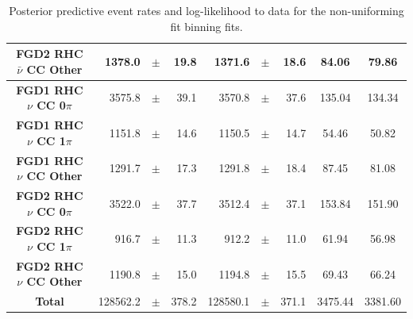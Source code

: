 \begin{center}
\begin{table}
\begin{adjustbox}{max width=1.1\textwidth,center}
\begin{tabular}{S||
                r
                p{0.26cm}
                r
                |r
                p{0.26cm}
                r
                |c
                |c}
\textbf{FGD2 RHC $\bar{\nu}$ CC Other} & 1378.0 & $\pm$ & 19.8 & 1371.6 & $\pm$ & 18.6 & 84.06 & 79.86 \\ \hline
\textbf{FGD1 RHC $\nu$ CC 0$\pi$} & 3575.8 & $\pm$ & 39.1 & 3570.8 & $\pm$ & 37.6 & 135.04 & 134.34 \\
\textbf{FGD1 RHC $\nu$ CC 1$\pi$} & 1151.8 & $\pm$ & 14.6 & 1150.5 & $\pm$ & 14.7 & 54.46 & 50.82 \\
\textbf{FGD1 RHC $\nu$ CC Other} & 1291.7 & $\pm$ & 17.3 & 1291.8 & $\pm$ & 18.4 & 87.45 & 81.08 \\ \hline
\textbf{FGD2 RHC $\nu$ CC 0$\pi$} & 3522.0 & $\pm$ & 37.7 & 3512.4 & $\pm$ & 37.1 & 153.84 & 151.90 \\
\textbf{FGD2 RHC $\nu$ CC 1$\pi$} & 916.7 & $\pm$ & 11.3 & 912.2 & $\pm$ & 11.0 & 61.94 & 56.98 \\
\textbf{FGD2 RHC $\nu$ CC Other} & 1190.8 & $\pm$ & 15.0 & 1194.8 & $\pm$ & 15.5 & 69.43 & 66.24 \\ \hline
\textbf{Total} & 128562.2 & $\pm$ & 378.2 & 128580.1 & $\pm$ & 371.1 & 3475.44 & 3381.60 \\ \hline\hline
\end{tabular}
\end{adjustbox}
\caption{Posterior predictive event rates and log-likelihood to data for the non-uniforming fit binning fits.}
\label{tab:polyrates}
\end{table}
\end{center}

